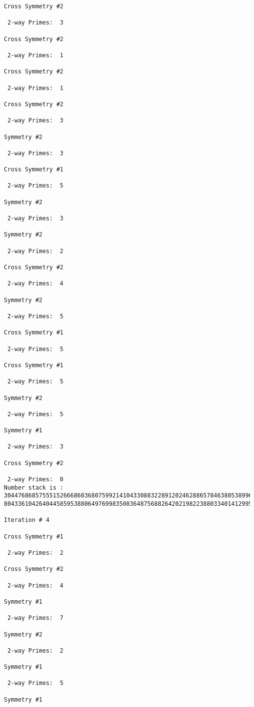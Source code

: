 \begin{verbatim}
Cross Symmetry #2

 2-way Primes: 	3

Cross Symmetry #2

 2-way Primes: 	1

Cross Symmetry #2

 2-way Primes: 	1

Cross Symmetry #2

 2-way Primes: 	3

Symmetry #2

 2-way Primes: 	3

Cross Symmetry #1

 2-way Primes: 	5

Symmetry #2

 2-way Primes: 	3

Symmetry #2

 2-way Primes: 	2

Cross Symmetry #2

 2-way Primes: 	4

Symmetry #2

 2-way Primes: 	5

Cross Symmetry #1

 2-way Primes: 	5

Cross Symmetry #1

 2-way Primes: 	5

Symmetry #2

 2-way Primes: 	5

Symmetry #1

 2-way Primes: 	3

Cross Symmetry #2

 2-way Primes: 	0
Number stack is :
30447686857555152666860368075992141043308832289120246288657846380538996794608835958544046240163340857
80433610426404458595388064976998350836487568826420219822388033401412995708630686662515557586867440375

Iteration #	4

Cross Symmetry #1

 2-way Primes: 	2

Cross Symmetry #2

 2-way Primes: 	4

Symmetry #1

 2-way Primes: 	7

Symmetry #2

 2-way Primes: 	2

Symmetry #1

 2-way Primes: 	5

Symmetry #1


\end{verbatim}
